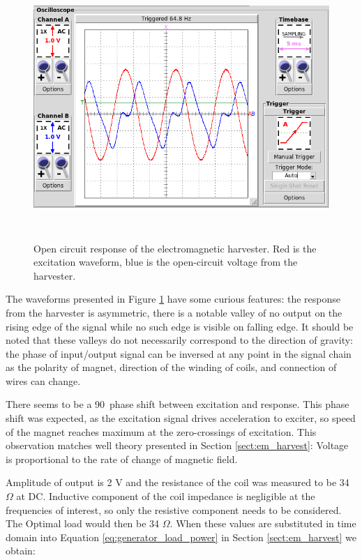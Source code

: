 \begin{figure}[htb]
\begin{center}
\includegraphics[height=10cm]{images/own_measurement/generator_shaker/inductive_td_open_65hz_dry.png}
\end{center}
\caption{\label{fig:inductive_65_open_dry} Open circuit response of the electromagnetic harvester. Red is the excitation waveform, blue is the open-circuit voltage from the harvester.}
\end{figure}

The waveforms presented in Figure \ref{fig:inductive_65_open_dry} have some curious features: the response from the harvester is asymmetric, there is a notable valley of no output on the rising edge of the signal while no such edge is visible on falling edge. It should be noted that these valleys do not necessarily correspond to the direction of gravity: the phase of input/output signal can be inversed at any point in the signal chain as the polarity of magnet, direction of the winding of coils, and connection of wires can change.

There seems to be a 90\degree \ phase shift between excitation and response. This phase shift was expected, as the excitation signal drives acceleration to exciter, so speed of the magnet reaches maximum at the zero-crossings of excitation. This observation matches well theory presented in Section \ref{sect:em_harvest}: Voltage is proportional to the rate of change of magnetic field. 

Amplitude of output is 2 V and the resistance of the coil was measured to be 34 $\Omega$ at DC. Inductive component of the coil impedance is negligible at the frequencies of interest, so only the resistive component needs to be considered. The Optimal load would then be 34 $\Omega$. When these values are substituted in time domain into Equation \ref{eq:generator_load_power} in Section \ref{sect:em_harvest} we obtain:

